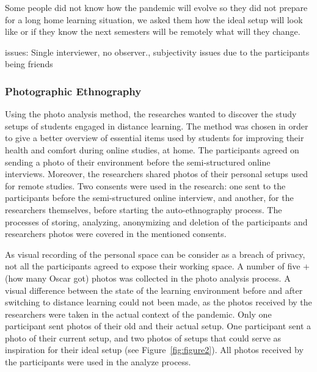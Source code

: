 \documentclass{sigchi}
\begin{document}
Some people did not know how the pandemic will evolve so they did not prepare for a long home learning situation, we asked them how the ideal setup will look like or if they know the next semesters  will be remotely what will they change.

issues: Single interviewer, no observer., subjectivity issues due to the participants being friends

\subsubsection{Photographic Ethnography}
Using the photo analysis method, the researches wanted to discover the study setups of students engaged in distance learning. The method was chosen in order to give a better overview of essential items used by students for improving their health and comfort during online studies, at home. The participants agreed on sending a photo of their environment before the semi-structured online interviews. Moreover, the researchers shared photos of their personal setups used for remote studies. Two consents were used in the research: one sent to the participants before the semi-structured online interview, and another, for the researchers themselves, before starting the auto-ethnography process. The processes of storing, analyzing, anonymizing and deletion of the participants and researchers photos were covered in the mentioned consents.

As visual recording of the personal space can be consider as a breach of privacy, not all the participants agreed to expose their working space. A number of five + (how many Oscar got) photos was collected in the photo analysis process. A visual difference between the state of the learning environment before and after switching to distance learning could not been made, as the photos received by the researchers were taken in the actual context of the pandemic. Only one participant sent photos of their old and their actual setup.  One participant sent a photo of their current setup, and two photos of setups that could serve as inspiration for their ideal setup (see Figure~\ref{fig:figure2}). All photos received by the participants were used in the analyze process.
\end{document}
